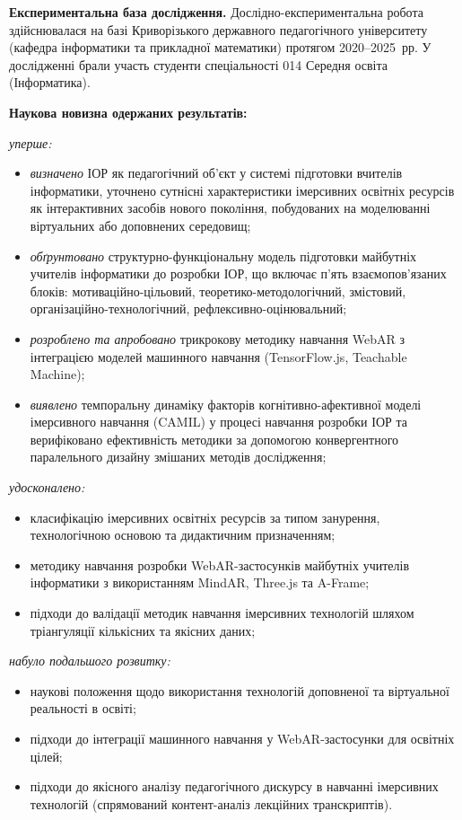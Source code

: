 \textbf{Експериментальна база дослідження.} Дослідно-експериментальна робота здійснювалася на базі Криворізького державного педагогічного університету (кафедра інформатики та прикладної математики) протягом 2020--2025~рр. У дослідженні брали участь студенти спеціальності 014 Середня освіта (Інформатика).

\textbf{Наукова новизна одержаних результатів:}

\textit{уперше:}
\begin{itemize}
    \item \textit{визначено} ІОР як педагогічний об'єкт у системі підготовки вчителів інформатики, уточнено сутнісні характеристики імерсивних освітніх ресурсів як інтерактивних засобів нового покоління, побудованих на моделюванні віртуальних або доповнених середовищ;
    \item \textit{обґрунтовано} структурно-функціональну модель підготовки майбутніх учителів інформатики до розробки ІОР, що включає п'ять взаємопов'язаних блоків: мотиваційно-цільовий, теоретико-методологічний, змістовий, організаційно-технологічний, рефлексивно-оцінювальний;
    \item \textit{розроблено та апробовано} трикрокову методику навчання WebAR з інтеграцією моделей машинного навчання (TensorFlow.js, Teachable Machine);
    \item \textit{виявлено} темпоральну динаміку факторів когнітивно-афективної моделі імерсивного навчання (CAMIL) у процесі навчання розробки ІОР та верифіковано ефективність методики за допомогою конвергентного паралельного дизайну змішаних методів дослідження;
\end{itemize}

\textit{удосконалено:}
\begin{itemize}
    \item класифікацію імерсивних освітніх ресурсів за типом занурення, технологічною основою та дидактичним призначенням;
    \item методику навчання розробки WebAR-застосунків майбутніх учителів інформатики з використанням MindAR, Three.js та A-Frame;
    \item підходи до валідації методик навчання імерсивних технологій шляхом тріангуляції кількісних та якісних даних;
\end{itemize}

\textit{набуло подальшого розвитку:}
\begin{itemize}
    \item наукові положення щодо використання технологій доповненої та віртуальної реальності в освіті;
    \item підходи до інтеграції машинного навчання у WebAR-застосунки для освітніх цілей;
    \item підходи до якісного аналізу педагогічного дискурсу в навчанні імерсивних технологій (спрямований контент-аналіз лекційних транскриптів).
\end{itemize}

